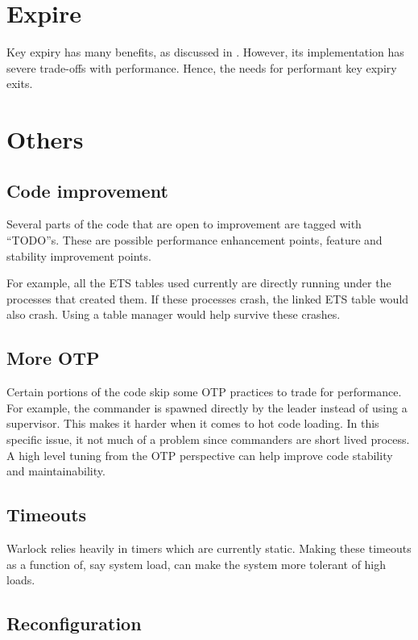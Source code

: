 \section{Expire}

Key expiry has many benefits, as discussed in . 
However, its implementation has severe trade-offs with performance. Hence, the
needs for performant key expiry exits.

\section{Others}

\subsection{Code improvement}

Several parts of the code that are open to improvement are tagged with 
``TODO''s. These are possible performance enhancement points, feature and
stability improvement points. 

For example, all the ETS tables used currently
are directly running under the processes that created them. If these processes
crash, the linked ETS table would also crash. Using a table manager would
help survive these crashes.

\subsection{More OTP}

Certain portions of the code skip some OTP practices to trade for performance.
For example, the commander is spawned directly by the leader instead of using
a supervisor. This makes it harder when it comes to hot code loading. In this
specific issue, it not much of a problem since commanders are short lived
process. A high level tuning from the OTP perspective can help improve code
stability and maintainability.

\subsection{Timeouts}

Warlock relies heavily in timers which are currently static. Making these
timeouts as a function of, say system load, can make the system more tolerant
of high loads.

\subsection{Reconfiguration}

